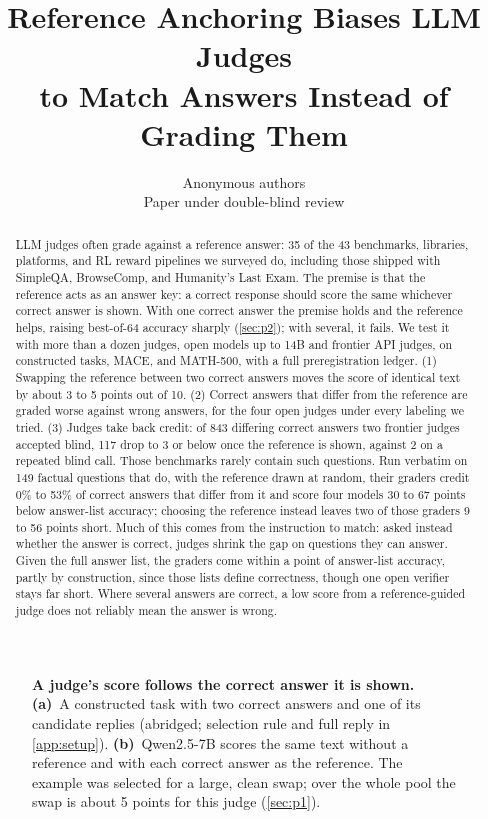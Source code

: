 \documentclass{article}
\title{Reference Anchoring Biases LLM Judges\\to Match Answers Instead of Grading Them}
\author{Anonymous authors\\Paper under double-blind review}
\begin{document}
\maketitle
\raggedbottom

\begin{abstract}
LLM judges often grade against a reference answer: 35 of the 43 benchmarks, libraries, platforms, and RL reward pipelines we surveyed do, including those shipped with SimpleQA, BrowseComp, and Humanity's Last Exam.
The premise is that the reference acts as an answer key: a correct response should score the same whichever correct answer is shown.
With one correct answer the premise holds and the reference helps, raising best-of-64 accuracy sharply (\cref{sec:p2}); with several, it fails.
We test it with more than a dozen judges, open models up to 14B and frontier API judges, on constructed tasks, MACE, and MATH-500, with a full preregistration ledger.
(1) Swapping the reference between two correct answers moves the score of identical text by about 3 to 5 points out of 10.
(2) Correct answers that differ from the reference are graded worse against wrong answers, for the four open judges under every labeling we tried.
(3) Judges take back credit: of 843 differing correct answers two frontier judges accepted blind, 117 drop to 3 or below once the reference is shown, against 2 on a repeated blind call.
Those benchmarks rarely contain such questions. Run verbatim on 149 factual questions that do, with the reference drawn at random, their graders credit 0\% to 53\% of correct answers that differ from it and score four models 30 to 67 points below answer-list accuracy; choosing the reference instead leaves two of those graders 9 to 56 points short.
Much of this comes from the instruction to match: asked instead whether the answer is correct, judges shrink the gap on questions they can answer.
Given the full answer list, the graders come within a point of answer-list accuracy, partly by construction, since those lists define correctness, though one open verifier stays far short.
Where several answers are correct, a low score from a reference-guided judge does not reliably mean the answer is wrong.
\end{abstract}

\begin{figure}[!b]
\centering
\resizebox{0.64\textwidth}{!}{}
\caption{\textbf{A judge's score follows the correct answer it is shown.}
\textbf{(a)}~A constructed task with two correct answers and one of its candidate replies (abridged; selection rule and full reply in \cref{app:setup}).
\textbf{(b)}~Qwen2.5-7B scores the same text without a reference and with each correct answer as the reference. The example was selected for a large, clean swap; over the whole pool the swap is about 5 points for this judge (\cref{sec:p1}).}
\label{fig:concept}
\end{figure}
\end{document}
